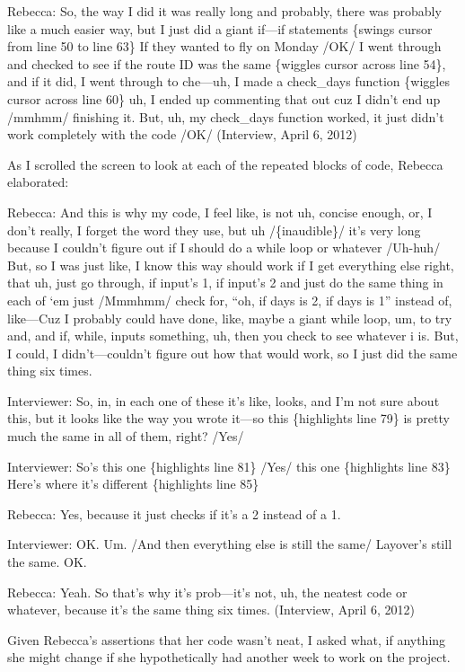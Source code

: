 Rebecca: So, the way I did it was really long and probably, there was probably like a much easier way, but I just did a giant if---if statements \{swings cursor from line 50 to line 63\} If they wanted to fly on Monday /OK/ I went through and checked to see if the route ID was the same \{wiggles cursor across line 54\}, and if it did, I went through to che---uh, I made a check\_days function \{wiggles cursor across line 60\} uh, I ended up commenting that out cuz I didn't end up /mmhmm/ finishing it. But, uh, my check\_days function worked, it just didn't work completely with the code /OK/ (Interview, April 6, 2012)

As I scrolled the screen to look at each of the repeated blocks of code, Rebecca elaborated:

Rebecca: And this is why my code, I feel like, is not uh, concise enough, or, I don't really, I forget the word they use, but uh /\{inaudible\}/ it's very long because I couldn't figure out if I should do a while loop or whatever /Uh-huh/ But, so I was just like, I know this way should work if I get everything else right, that uh, just go through, if input's 1, if input's 2 and just do the same thing in each of `em just /Mmmhmm/ check for, ``oh, if days is 2, if days is 1'' instead of, like---Cuz I probably could have done, like, maybe a giant while loop, um, to try and, and if, while, inputs something, uh, then you check to see whatever i is. But, I could, I didn't---couldn't figure out how that would work, so I just did the same thing six times.

Interviewer: So, in, in each one of these it's like, looks, and I'm not sure about this, but it looks like the way you wrote it---so this \{highlights line 79\} is pretty much the same in all of them, right? /Yes/

Interviewer: So's this one \{highlights line 81\} /Yes/ this one \{highlights line 83\} Here's where it's different \{highlights line 85\}

Rebecca: Yes, because it just checks if it's a 2 instead of a 1.

Interviewer: OK. Um. /And then everything else is still the same/ Layover's still the same. OK.

Rebecca: Yeah. So that's why it's prob---it's not, uh, the neatest code or whatever, because it's the same thing six times. (Interview, April 6, 2012)

Given Rebecca's assertions that her code wasn't neat, I asked what, if anything she might change if she hypothetically had another week to work on the project.

